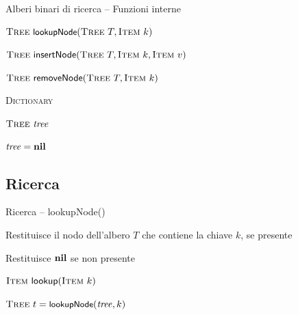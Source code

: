 \begin{frame}{Alberi binari di ricerca -- Funzioni interne}

\BIL
\item \alert{$\Tree\ \lookupnode(\Tree\ T, \Item\ k)$}
\item \alert{$\Tree\ \textsf{insertNode}(\Tree\ T, \Item\ k, \Item\ v)$}
\item \alert{$\Tree\ \textsf{removeNode}(\Tree\ T, \Item\ k)$}
\EIL

\begin{Procedure}
\caption{\textsc{Dictionary}}

$\textsc{Tree}\ \mathit{tree}$\;

\BlankLine
{}
{
  $\mathit{tree} = \textbf{nil}$\;
}



\end{Procedure}

\end{frame}



\subsection{Ricerca}

\begin{frame}{Ricerca -- \textsf{lookupNode}()}

\vspace{-9pt}
\begin{myboxtitle}
\BIL
\item Restituisce il nodo dell'albero $T$ che contiene la chiave $k$, se presente
\item Restituisce $\textbf{nil}$ se non presente
\EIL
\end{myboxtitle}

\begin{myboxtitle}
\vspace{-12pt}
\begin{Procedure}
\caption[A]{$\Item\ \textsf{lookup}(\Item\ k)$}
$\textsc{Tree}\ t = \textsf{{\small lookupNode}}(\mathit{tree}, k)$\;
\end{Procedure}
\vspace{-12pt}
\end{myboxtitle}

\end{frame}


